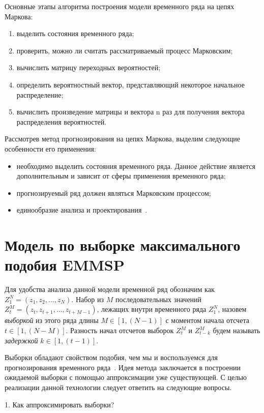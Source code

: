 Основные этапы алгоритма построения модели временного ряда на цепях Маркова:
\begin{enumerate}
    \item выделить состояния временного ряда;
    \item проверить, можно ли считать рассматриваемый процесс Марковским;
    \item вычислить матрицу переходных вероятностей;
    \item определить вероятностный вектор, представляющий некоторое начальное распределение;
    \item вычислить произведение матрицы и вектора n раз для получения вектора распределения вероятностей.
\end{enumerate}

Рассмотрев метод прогнозирования на цепях Маркова, выделим следующие особенности его применения:
\begin{itemize}
    \item необходимо выделить состояния временного ряда.
    Данное действие является дополнительным и зависит от сферы применения временного ряда;
    \item прогнозируемый ряд должен являться Марковским процессом;
    \item единообразие анализа и проектирования~\cite{myref9}.
\end{itemize}

\section{Модель по выборке максимального подобия EMMSP}

Для удобства анализа данной модели временной ряд обозначим как $Z_1^N=(z_1,z_2,\ldots,z_N)$.
Набор из $M$ последовательных значений \newline $Z_t^M=(z_t,z_{t+1},\ldots,z_{t+M-1})$, лежащих внутри временного ряда $Z_1^N$,
назовем \textit{выборкой} из этого ряда длины $M\in[1,(N-1)]$ с моментом начала отсчета $t\in[1,(N-M)]$.
Разность начал отсчетов выборок $Z_t^M$ и $Z_{t-k}^M$ будем называть \textit{задержкой} $k\in[1,(t-1)]$.

Выборки обладают свойством подобия, чем мы и воспользуемся для прогнозирования временного ряда~\cite{myref9}.
Идея метода заключается в построении ожидаемой выборки с помощью аппроксимации уже существующей.
С целью реализации данной технологии следует ответить на следующие вопросы.

1. Как аппроксимировать выборки?

